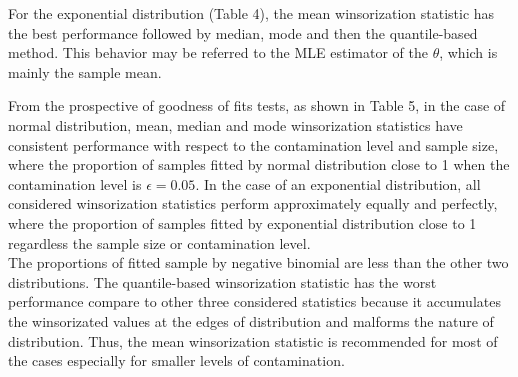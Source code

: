 \documentclass[notitlepage,12pt]{jedm}
\begin{document}
For the exponential distribution (Table 4), the mean winsorization
statistic has the best performance followed by median, mode and then the
quantile-based method. This behavior may be referred to the MLE
estimator of the \(\theta\), which is mainly the sample mean.

From the prospective of goodness of fits tests, as shown in Table 5, in
the case of normal distribution, mean, median and mode winsorization
statistics have consistent performance with respect to the contamination
level and sample size, where the proportion of samples fitted by normal
distribution close to 1 when the contamination level is
\(\epsilon=0.05\). In the case of an exponential distribution, all
considered winsorization statistics perform approximately equally and
perfectly, where the proportion of samples fitted by exponential
distribution close to 1 regardless the sample size or contamination
level.\\
The proportions of fitted sample by negative binomial are less than the
other two distributions. The quantile-based winsorization statistic has
the worst performance compare to other three considered statistics
because it accumulates the winsorizated values at the edges of
distribution and malforms the nature of distribution. Thus, the mean
winsorization statistic is recommended for most of the cases especially
for smaller levels of contamination.
\end{document}

